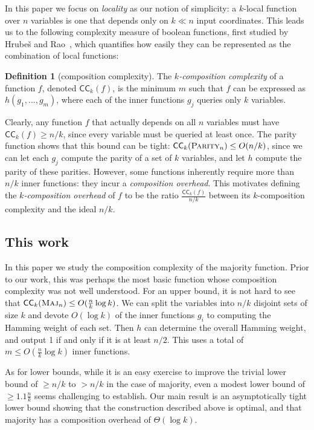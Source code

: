 \documentclass[10pt,a4paper]{article}
\theoremstyle{definition}
\newtheorem{definition}[lemma]{Definition}
\theoremstyle{remark}
\newcommand{\mathsc}[1]{{\normalfont\textsc{#1}}}
\DeclareMathOperator{\Maj}{\mathsc{Maj}}
\newcommand{\Parity}{\mathsc{Parity}}
\newcommand{\Majority}{\Maj}
\newcommand{\CC}{\mathsf{CC}}
\begin{document}
In this paper we focus on \emph{locality} as our notion of simplicity: a $k$-local function over $n$ variables is one that depends only on $k \ll n$ input coordinates.
This leads us to the following complexity measure of boolean functions, first
studied
by Hrube\v{s} and Rao~\cite{HR15}, which quantifies how easily they can be represented as the combination of local functions:


\begin{definition}[composition complexity]
\label{def:complexity}
The \emph{$k$-composition complexity} of a function $f$, denoted $\CC_k(f)$, is the minimum $m$ such that $f$ can be expressed as $h(g_1, \ldots, g_m)$, where each of the inner functions
$g_j$
queries only $k$ variables.
\end{definition}



Clearly, any function $f$ that actually depends on all $n$ variables must have $\CC_k(f) \geq n/k$, since every variable must be queried at least once.
The parity function shows that this bound can be tight: $\CC_k(\Parity_n) \leq O(n/k)$, since we can let each $g_j$ compute the parity of a set of
$k$ variables, and let $h$ compute the parity of these parities.
However, some functions inherently require more than $n/k$ inner functions: they incur a \emph{composition overhead}.  This motivates defining the \emph{$k$-composition overhead} of  $f$ to be the ratio $\frac{\CC_k(f)}{n/k}$ between its $k$-composition complexity and the ideal $n/k$.

\subsection{This work}
In this paper we study the composition complexity of the majority function.
Prior to our work, this was perhaps the most basic function whose composition complexity was not well understood.
For an upper bound, it is not hard to see that $\CC_k(\Majority_n) \leq O(\frac{n}{k} \log k)$.
We can split the variables into $n/k$ disjoint sets of size $k$ and devote $O(\log k)$ of the inner functions $g_i$ to computing the Hamming weight of each set.
Then $h$ can determine the overall Hamming weight, and output 1 if and only if it is at least $n/2$.
This uses a total of $m \leq O(\frac{n}{k} \log k)$ inner functions.

As for lower bounds, while it is an easy exercise to improve the trivial lower bound of $\ge n/k$
to $> n/k$
in the case of majority,
even a modest lower bound of $\ge 1.1 \frac{n}{k}$ seems challenging to establish.
Our main result is an asymptotically tight lower bound showing that the construction described above is optimal, and that majority has a composition overhead of $\Theta(\log k)$.
\end{document}
